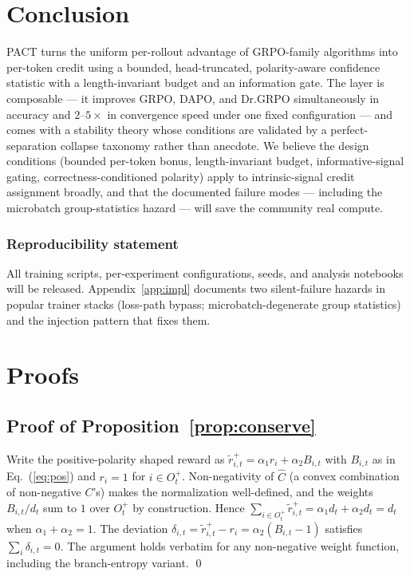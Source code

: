 \documentclass{article} %
\theoremstyle{plain}
\theoremstyle{definition}
\theoremstyle{remark}
\newcommand{\method}{PACT}
\begin{document}
\section{Conclusion}
\label{sec:conclusion}

\method{} turns the uniform per-rollout advantage of GRPO-family algorithms into per-token credit using a bounded, head-truncated, polarity-aware confidence statistic with a length-invariant budget and an information gate. The layer is composable --- it improves GRPO, DAPO, and Dr.GRPO simultaneously in accuracy and $2$--$5\times$ in convergence speed under one fixed configuration --- and comes with a stability theory whose conditions are validated by a perfect-separation collapse taxonomy rather than anecdote. We believe the design conditions (bounded per-token bonus, length-invariant budget, informative-signal gating, correctness-conditioned polarity) apply to intrinsic-signal credit assignment broadly, and that the documented failure modes --- including the microbatch group-statistics hazard --- will save the community real compute.

\subsubsection*{Reproducibility statement}
All training scripts, per-experiment configurations, seeds, and analysis notebooks will be released. Appendix~\ref{app:impl} documents two silent-failure hazards in popular trainer stacks (loss-path bypass; microbatch-degenerate group statistics) and the injection pattern that fixes them.




\appendix

\section{Proofs}
\label{app:proofs}

\subsection{Proof of Proposition~\ref{prop:conserve}}
Write the positive-polarity shaped reward as $\tilde r^+_{i,t} = \alpha_1 r_i + \alpha_2 B_{i,t}$ with $B_{i,t}$ as in Eq.~(\ref{eq:pos}) and $r_i = 1$ for $i \in O^+_t$. Non-negativity of $\hat C$ (a convex combination of non-negative $C$'s) makes the normalization well-defined, and the weights $B_{i,t}/d_t$ sum to $1$ over $O^+_t$ by construction. Hence
$\sum_{i\in O^+_t} \tilde r^+_{i,t} = \alpha_1 d_t + \alpha_2 d_t = d_t$ when $\alpha_1+\alpha_2=1$. The deviation $\delta_{i,t} = \tilde r^+_{i,t} - r_i = \alpha_2 (B_{i,t} - 1)$ satisfies $\sum_i \delta_{i,t} = 0$. The argument holds verbatim for any non-negative weight function, including the branch-entropy variant. \qed
\end{document}

